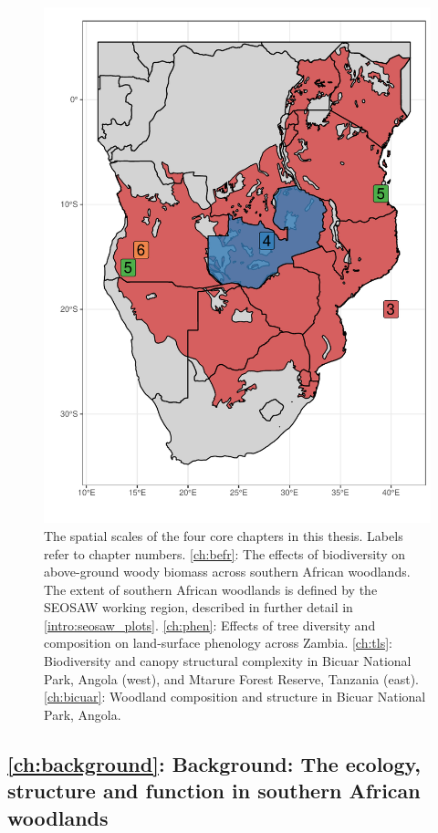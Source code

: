 \begin{refsection}
\begin{figure}
	\includegraphics[width=0.8\linewidth]{img/thesis_map}
	\caption[Map of thesis study locations]{The spatial scales of the four core chapters in this thesis. Labels refer to chapter numbers. \autoref{ch:befr}: The effects of biodiversity on above-ground woody biomass across southern African woodlands. The extent of southern African woodlands is defined by the SEOSAW working region, described in further detail in \autoref{intro:seosaw_plots}. \autoref{ch:phen}: Effects of tree diversity and composition on land-surface phenology across Zambia. \autoref{ch:tls}: Biodiversity and canopy structural complexity in Bicuar National Park, Angola (west), and Mtarure Forest Reserve, Tanzania (east). \autoref{ch:bicuar}: Woodland composition and structure in Bicuar National Park, Angola.}
	\label{intro:thesis_map}
\end{figure}

\subsection{\autoref{ch:background}: Background: The ecology, structure and function in southern African woodlands}
\label{intro:ssec:ch:background}


\end{refsection}
